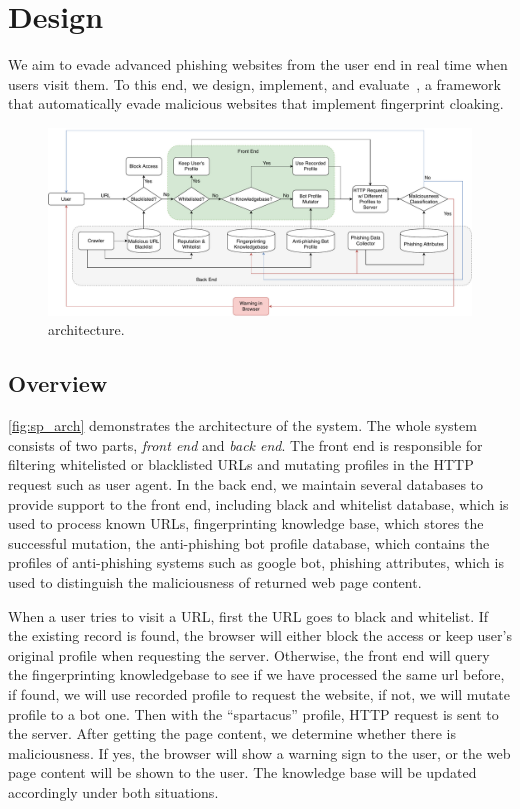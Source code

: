 \section{Design}

We aim to evade advanced phishing websites from the user end in real time when users visit them.
To this end, we design, implement, and evaluate~\spartacus, a framework that automatically evade malicious websites that implement fingerprint cloaking.

\begin{figure}
\centering
\includegraphics[width=\linewidth]{figs/arch.pdf}
\caption{\spartacus architecture.}
\label{fig:sp_arch}
\end{figure}

\subsection{Overview}
\autoref{fig:sp_arch} demonstrates the architecture of the \spartacus system.
The whole system consists of two parts, \emph{front end} and \emph{back end}. 
The front end is responsible for filtering whitelisted or blacklisted URLs and mutating profiles in the HTTP request such as user agent. 
In the back end, we maintain several databases to provide support to the front end, including black and whitelist database, which is used to process known URLs, fingerprinting knowledge base, which stores the successful mutation, the anti-phishing bot profile database, which contains the profiles of anti-phishing systems such as google bot, phishing attributes, which is used to distinguish the maliciousness of returned web page content. 

When a user tries to visit a URL, first the URL goes to black and whitelist. 
If the existing record is found, the browser will either block the access or keep user's original profile when requesting the server. 
Otherwise, the front end will query the fingerprinting knowledgebase to see if we have processed the same url before, if found, we will use recorded profile to request the website, if not, we will mutate profile to a bot one. Then with the “spartacus” profile, HTTP request is sent to the server. After getting the page content, we determine whether there is maliciousness. If yes, the browser will show a warning sign to the user, or the web page content will be shown to the user. The knowledge base will be updated accordingly under both situations. 

